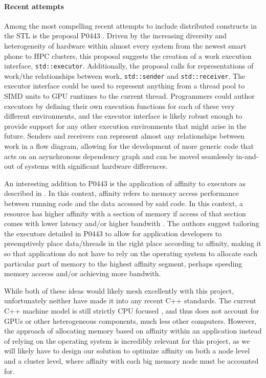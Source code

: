 \paragraph{Recent attempts}
Among the most compelling recent attempts to include distributed constructs in the STL is the proposal P0443 \cite{p0443}. Driven by the increasing diversity and heterogeneity of hardware within almost every system from the newest smart phone to HPC clusters, this proposal suggests the creation of a work execution interface, \texttt{std::executor}. Additionally, the proposal calls for representations of work/the relationships between work, \texttt{std::sender} and \texttt{std::receiver}. The executor interface could be used to represent anything from a thread pool to SIMD units to GPU runtimes to the current thread. Programmers could author executors by defining their own execution functions for each of these very different environments, and the executor interface is likely robust enough to provide support for any other execution environments that might arise in the future. Senders and receivers can represent almost any relationships between work in a flow diagram, allowing for the development of more generic code that acts on an asynchronous dependency graph and can be moved seamlessly in-and-out of systems with significant hardware differences. 

An interesting addition to P0443 is the application of affinity to executors as described in \cite{towards_dist_cpp}. In this context, affinity refers to memory access performance between running code and the data accessed by said code. In this context, a resource has higher affinity with a section of memory if access of that section comes with lower latency and/or higher bandwith \cite{towards_dist_cpp}. The authors suggest tailoring the executors detailed in P0443 to allow for application developers to preemptively place data/threads in the right place according to affinity, making it so that applications do not have to rely on the operating system to allocate each particular part of memory to the highest affinity segment, perhaps speeding memory accecss and/or achieving more bandwith. 

While both of these ideas would likely mesh excellently with this project, unfortunately neither have made it into any recent C++ standards. The current C++ machine model is still strictly CPU focused \cite{towards_dist_cpp}, and thus does not account for GPUs or other heterogeneous components, much less other computers. However, the approach of allocating memory based on affinity within an application instead of relying on the operating system is incredibly relevant for this project, as we will likely have to design our solution to optimize affinity on both a node level and a cluster level, where affinity with each big memory node must be accounted for.  

